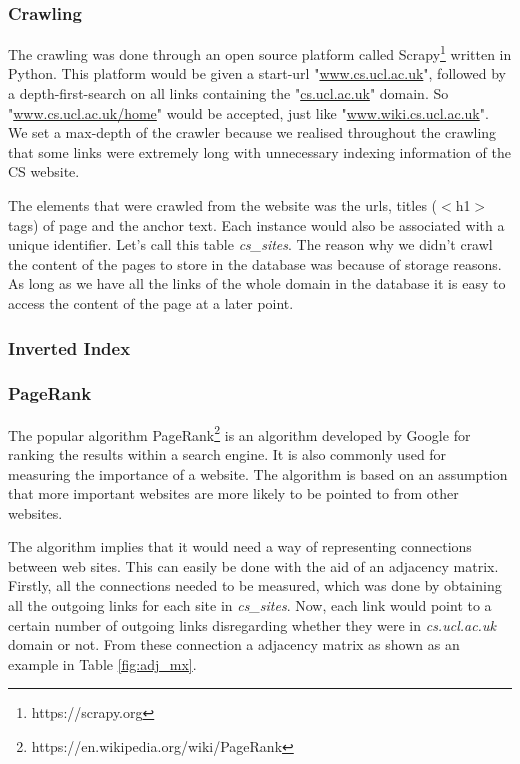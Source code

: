 
\subsubsection{Crawling} %
\label{ssub:crawling}

The crawling was done through an open source platform called Scrapy\footnote{https://scrapy.org} written in Python. This platform would be given a start-url "\url{www.cs.ucl.ac.uk}", followed by a depth-first-search on all links containing the "\url{cs.ucl.ac.uk}" domain. So "\url{www.cs.ucl.ac.uk/home}" would be accepted, just like "\url{www.wiki.cs.ucl.ac.uk}". We set a max-depth of the crawler because we realised throughout the crawling that some links were extremely long with unnecessary indexing information of the CS website.

The elements that were crawled from the website was the urls, titles ($<$h1$>$ tags) of page and the anchor text. Each instance would also be associated with a unique identifier. Let's call this table \emph{cs\_sites}. The reason why we didn't crawl the content of the pages to store in the database was because of storage reasons. As long as we have all the links of the whole domain in the database it is easy to access the content of the page at a later point.


\subsubsection{Inverted Index} %
\label{ssub:inverted_index}


\subsubsection{PageRank} %
\label{ssub:pagerank}

The popular algorithm PageRank\footnote{https://en.wikipedia.org/wiki/PageRank} is an algorithm developed by Google for ranking the results within a search engine. It is also commonly used for measuring the importance of a website. The algorithm is based on an assumption that more important websites are more likely to be pointed to from other websites.

The algorithm implies that it would need a way of representing connections between web sites. This can easily be done with the aid of an adjacency matrix. Firstly, all the connections needed to be measured, which was done by obtaining all the outgoing links for each site in \emph{cs\_sites}. Now, each link would point to a certain number of outgoing links disregarding whether they were in \emph{cs.ucl.ac.uk} domain or not. From these connection a adjacency matrix as shown as an example in Table \ref{fig:adj_mx}. 


